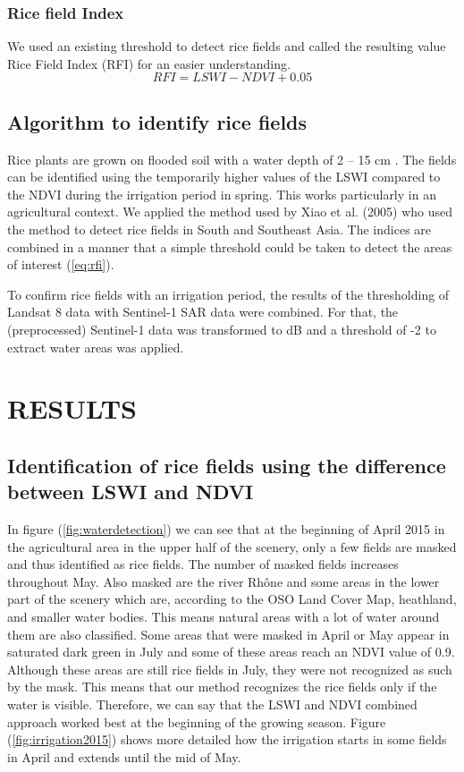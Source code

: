 \documentclass[a4paper, 10pt, conference]{ieeeconf}      %
\begin{document}
\subsubsection{Rice field Index}
We used an existing threshold \cite{Xiao2005MappingImages} to detect rice fields and called the resulting value Rice Field Index (RFI) for an easier understanding.
\begin{equation}
\label{eq:rfi}
RFI = {LSWI-NDVI+0.05}
\end{equation}


\subsection{Algorithm to identify rice fields}

Rice plants are grown on flooded soil with a water depth of 2 – 15 cm \cite{Xiao2005MappingImages}. The fields can be identified using the temporarily higher values of the LSWI compared to the NDVI during the irrigation period in spring. This works particularly in an agricultural context. We applied the method used by Xiao et al. (2005) who used the method to detect rice fields in South and Southeast Asia. The indices are combined in a manner that a simple threshold could be taken to detect the areas of interest (\ref{eq:rfi}). 

To confirm rice fields with an irrigation period, the results of the thresholding of Landsat 8 data with Sentinel-1 SAR data were combined. For that, the (preprocessed) Sentinel-1 data was transformed to dB and a threshold of -2 to extract water areas was applied.




\section{RESULTS}

\subsection{Identification of rice fields using the difference between LSWI and NDVI}

In figure (\ref{fig:waterdetection}) we can see that at the beginning of April 2015 in the agricultural area in the upper half of the scenery, only a few fields are masked and thus identified as rice fields. The number of masked fields increases throughout May. Also masked are the river Rhône and some areas in the lower part of the scenery which are, according to the OSO Land Cover Map, heathland, and smaller water bodies. This means natural areas with a lot of water around them are also classified. Some areas that were masked in April or May appear in saturated dark green in July and some of these areas reach an NDVI value of 0.9. Although these areas are still rice fields in July, they were not recognized as such by the mask. This means that our method recognizes the rice fields only if the water is visible. Therefore, we can say that the LSWI and NDVI combined approach worked best at the beginning of the growing season. Figure (\ref{fig:irrigation2015}) shows more detailed how the irrigation starts in some fields in April and extends until the mid of May.
\end{document}
